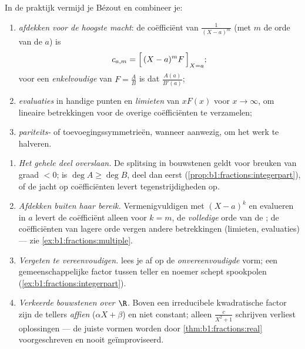 \begin{method}\label{met:b1:fractions:compute}
In de praktijk vermijd je Bézout en combineer je:
\begin{enumerate}
  \item \emph{afdekken voor de hoogste macht}: de coëfficiënt van
        $\frac{1}{(X-a)^m}$ (met $m$ de orde van de  $a$) is
        \[
        c_{a,m} = \Bigl[\,(X - a)^m F\,\Bigr]_{X = a};
        \]
        voor een \emph{enkelvoudige}  van $F = \frac AB$ is dat
        $\frac{A(a)}{B'(a)}$;
  \item \emph{evaluaties} in handige punten en \emph{limieten} van
        $xF(x)$ voor $x \to \infty$, om lineaire betrekkingen voor de
        overige coëfficiënten te verzamelen;
  \item \emph{pariteits-} of toevoegingssymmetrieën, wanneer aanwezig, om
        het werk te halveren.
\end{enumerate}
\end{method}

\begin{remark}\label{rem:b1:fractions:pitfalls}
\begin{enumerate}
  \item \emph{Het gehele deel overslaan.} De splitsing in bouwstenen
        geldt voor breuken van graad $< 0$; is $\deg A \geq \deg B$,
        deel dan eerst (\cref{prop:b1:fractions:integerpart}), of de
        jacht op coëfficiënten levert tegenstrijdigheden op.
  \item \emph{Afdekken buiten haar bereik.} Vermenigvuldigen met $(X -
        a)^k$ en evalueren in $a$ levert de coëfficiënt alleen voor $k =
        m$, de \emph{volledige} orde van de ; de coëfficiënten van
        lagere orde vergen andere betrekkingen (limieten, evaluaties)
        --- zie \cref{ex:b1:fractions:multiple}.
  \item \emph{Vergeten te vereenvoudigen.}  lees je af op de
        \emph{onvereenvoudigde} vorm; een gemeenschappelijke factor
        tussen teller en noemer schept spookpolen
        (\cref{ex:b1:fractions:integerpart}).
  \item \emph{Verkeerde bouwstenen over $\R$.} Boven een irreducibele
        kwadratische factor zijn de tellers \emph{affien} ($\alpha X +
        \beta$) en niet constant; alleen $\frac{c}{X^2 + 1}$ schrijven
        verliest oplossingen --- de juiste vormen worden door
        \cref{thm:b1:fractions:real} voorgeschreven en nooit
        geïmproviseerd.
\end{enumerate}
\end{remark}

